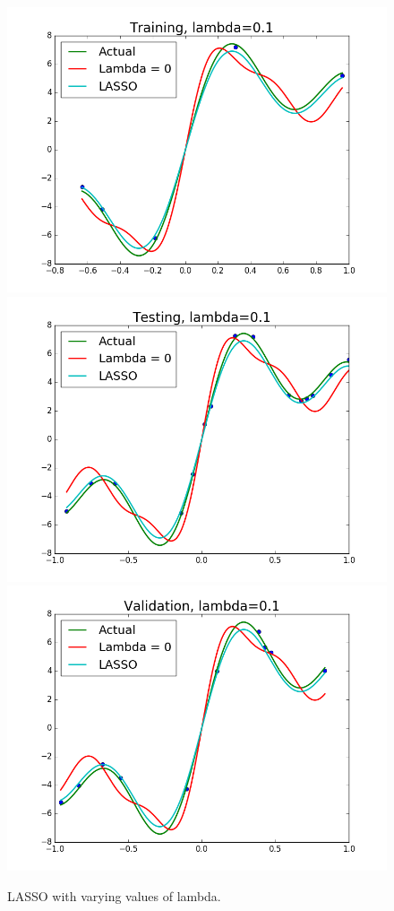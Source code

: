 \documentclass{article}
\begin{document}
\begin{figure}[width=\linewidth]
\centering
\begin{multicols}{2}
  \includegraphics[width=1.2\linewidth]{code/P4/training,01.png}
  \includegraphics[width=1.2\linewidth]{code/P4/testing,01.png}
  \includegraphics[width=1.2\linewidth]{code/P4/validation,01.png}
\end{multicols}
\caption{LASSO with varying values of lambda.}
\end{figure}
\end{document}
